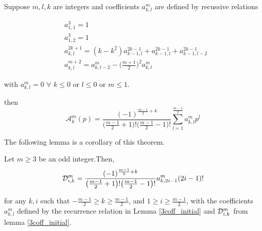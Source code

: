 \documentclass[../document.tex]{subfiles}
\begin{document}
	
	\begin{theorem}   \label{recussive}
		Suppose $m,l,k$ are integers and coefficients $a^{m}_{k,l}$ are defined by recussive relations
		
		\begin{subequations}  \label{recussive_eqn}
			\begin{align}
				&a^{3}_{1,1} = 1 \label{recussive_eqn_A}   \\
				&a^{3}_{1,2} = 1 \label{recussive_eqn_B}   \\
				&a^{2k+1}_{k,l} = (k - k^2) a^{2k-1}_{k-1,l} + a^{2k-1}_{k-1,l}  + a^{2k-1}_{k-1,l-2}  \label{recussive_eqn_C}   \\
				&a^{m+2}_{k,l} = a^{m}_{k,l-2} -
				\big( \frac{m+1}{2} \big)^2 a^{m}_{k,l} \label{recussive_eqn_D}   
			\end{align}
		\end{subequations}
		
		with $a^{m}_{k,l} = 0$ $\forall$ $k \leq 0 $ or $l \leq 0$ or $m \leq 1$.
		
		then
		$$
		\mathcal{A}_{k}^{m} (p) = 
		\frac{		(-1)^{\frac{m-1}{2} + k}		
		}{	\big( \frac{m-1}{2} +1 \big)!
			\big( \frac{m-1}{2} -1 \big)! 
		}
		\sum_{l=1}^{	\frac{m-1}{2}	}
		a^{m}_{k,l} p^{l}
		$$
		
	\end{theorem}
	
	The following lemma is a corollary of this theorem. 
	
	\begin{lemma} \label{theorem28}
		Let $m\geq 3$ be an odd integer.Then,
		\begin{equation*}  \label{3coff_final}
			\mathcal{D}_{i,k}^{m} = 
			\frac{		(-1)^{\frac{m-1}{2} + k}		
			}{	\big( \frac{m-1}{2} +1 \big)!
				\big( \frac{m-1}{2} -1 \big)! 
			}
			a_{k,2i-1}^{m} (2i-1)!
		\end{equation*}
		
		for any $k,i$ such that $-\frac{m-1}{2} \geq k \geq \frac{m-1}{2}$, and
		$1 \geq i \geq \frac{m-1}{2}$, with the coefficients $a_{k,l}^{m}$
		defined by the recurrence relation in Lemma \ref{3coff_initial} and $\mathcal{D}_{i,k}^{m}$ from lemma \ref{3coff_initial}.
		
	\end{lemma}
	
\end{document}
